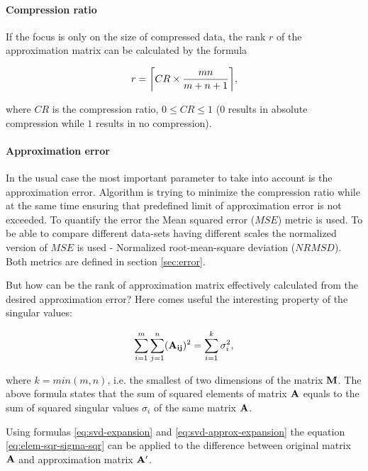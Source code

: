 \paragraph{Compression ratio}
If the focus is only on the size of compressed data, the rank $r$ of the approximation matrix can be calculated by the formula

\begin{equation}
r=\ceil*{CR \times \frac{m n}{m+n+1}},
\end{equation}

\noindent
where $CR$ is the compression ratio, $0 \leq CR \leq 1$ ($0$ results in absolute compression while $1$ results in no compression).

\paragraph{Approximation error}
In the usual case the most important parameter to take into account is the approximation error. Algorithm is trying to minimize the compression ratio while at the same time ensuring that predefined limit of approximation error is not exceeded. To quantify the error the Mean squared error ($MSE$) metric is used. To be able to compare different data-sets having different scales the normalized version of $MSE$ is used - Normalized root-mean-square deviation ($NRMSD$). Both metrics are defined in section \ref{sec:error}.

But how can be the rank of approximation matrix effectively calculated from the desired approximation error? Here comes useful the interesting property of the singular values:


\begin{equation}
\sum_{i=1}^{m} \sum_{j=1}^{n} (\mathbf{A_{ij}})^{2} = \sum_{i=1}^{k}{\sigma_{i}^{2}},
\label{eq:elem-sqr-sigma-sqr}
\end{equation}

\noindent
where $k=min(m, n)$, i.e. the smallest of two dimensions of the matrix $\mathbf{M}$. The above formula states that the sum of squared elements of matrix $\mathbf{A}$ equals to the sum of squared singular values $\sigma_{i}$ of the same matrix $\mathbf{A}$.

Using formulas \eqref{eq:svd-expansion} and \eqref{eq:svd-approx-expansion} the equation \eqref{eq:elem-sqr-sigma-sqr} can be applied to the difference between original matrix $\mathbf{A}$ and approximation matrix $\mathbf{A'}$.

